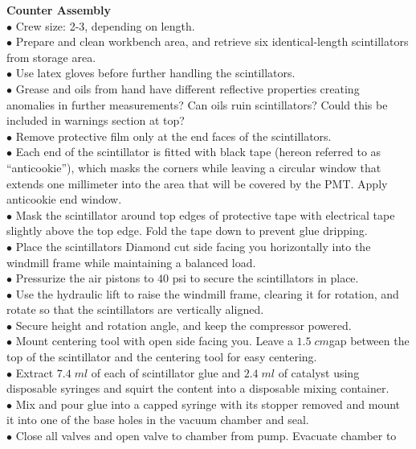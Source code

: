 \textbf{\color[rgb]{1,0.5,0}Counter Assembly}\\
$\bullet$ Crew size: 2-3, depending on length.\\
$\bullet$ Prepare and clean workbench area, and retrieve six identical-length scintillators from storage area.\\
$\bullet$ Use latex gloves before further handling the scintillators.\\
{\color{blue} $\bullet$ Grease and oils from hand have different reflective properties creating anomalies in further measurements? Can oils ruin scintillators? Could this be included in warnings section at top?}\\
$\bullet$ Remove protective film only at the end faces of the scintillators.\\
$\bullet$ Each end of the scintillator is fitted with black tape (hereon referred to as ``anticookie''), which masks the corners while leaving a circular window that extends one millimeter into the area that will be covered by the PMT. Apply anticookie end window.\\
$\bullet$ Mask the scintillator around top edges of protective tape with electrical tape slightly above the top edge. Fold the tape down to prevent glue dripping.\\
$\bullet$ Place the scintillators Diamond cut side facing you horizontally into the
windmill frame while maintaining a balanced load.\\
$\bullet$ Pressurize the air pistons to $40$ psi to secure the scintillators in place.\\
$\bullet$ Use the hydraulic lift to raise the windmill frame, clearing it for rotation, and
rotate so that the scintillators are vertically aligned.\\
$\bullet$ Secure height and rotation angle, and keep the compressor powered.\\
$\bullet$ Mount centering tool with open side facing you. Leave a $1.5\;cm$gap between
the top of the scintillator and the centering tool for easy centering.\\
$\bullet$ Extract $7.4 \;ml$ of each of scintillator glue and $2.4\; ml$ of catalyst using disposable syringes and squirt the content into a disposable mixing container.\\
$\bullet$ Mix and pour glue into a capped syringe with its stopper removed and mount it into one of the base holes in the vacuum chamber and seal.\\
$\bullet$ Close all valves and open valve to chamber from pump. Evacuate chamber to
